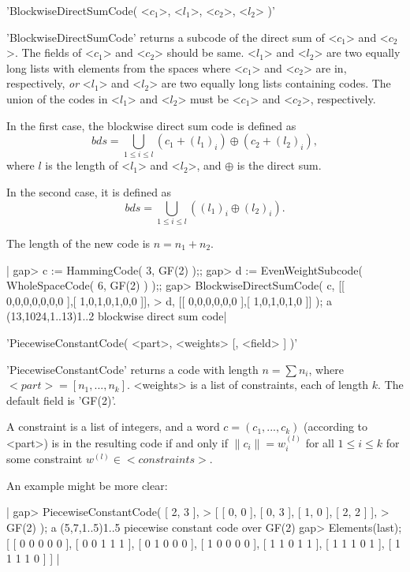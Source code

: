 'BlockwiseDirectSumCode( <$c_1$>, <$l_1$>, <$c_2$>, <$l_2$> )'

'BlockwiseDirectSumCode' returns a subcode of the direct sum of
<$c_1$> and <$c_2$>.
The fields of <$c_1$> and <$c_2$> should be same.
<$l_1$> and <$l_2$> are two equally long lists with elements from
the spaces where <$c_1$> and <$c_2$> are in, respectively,
{\em or} <$l_1$> and <$l_2$> are two equally long lists containing
codes. The union of the codes in <$l_1$> and <$l_2$> must be <$c_1$> and
<$c_2$>, respectively.

In the first case,
the blockwise direct sum code is defined as
$$ bds = \bigcup_{1 \leq i \leq l} 
	( c_1 + (l_1)_i ) \oplus ( c_2 + (l_2)_i ), $$
where $l$ is the length of <$l_1$> and <$l_2$>,
and $\oplus$ is the direct sum.

In the second case, it is defined as
$$ bds = \bigcup_{1 \leq i \leq l}
    ( (l_1)_i \oplus (l_2)_i ). $$

The length of the new code is
$ n = n_1 + n_2 $.

|    gap> c := HammingCode( 3, GF(2) );;
    gap> d := EvenWeightSubcode( WholeSpaceCode( 6, GF(2) ) );;
    gap> BlockwiseDirectSumCode( c, [[ 0,0,0,0,0,0,0 ],[ 1,0,1,0,1,0,0 ]],
    > d, [[ 0,0,0,0,0,0 ],[ 1,0,1,0,1,0 ]] );
    a (13,1024,1..13)1..2 blockwise direct sum code|




'PiecewiseConstantCode( <part>, <weights> [, <field> ] )'

'PiecewiseConstantCode' returns a code with length $n = \sum n_i$,
where $<part>=[ n_1, ..., n_k ]$.
<weights> is a list of constraints, each of length $k$.
The default field is 'GF(2)'.

A constraint is a list of integers, and
a word $c = ( c_1, ..., c_k )$ (according to <part>) 
is in the resulting code if and only if
$\|c_i\| = w_i^{(l)}$ for all $1 \leq i \leq k$
for some constraint $w^{(l)} \in <constraints>$.

An example might be more clear:

|    gap> PiecewiseConstantCode( [ 2, 3 ],
    > [ [ 0, 0 ], [ 0, 3 ], [ 1, 0 ], [ 2, 2 ] ],
    > GF(2) );
    a (5,7,1..5)1..5 piecewise constant code over GF(2)
    gap> Elements(last);
    [ [ 0 0 0 0 0 ], [ 0 0 1 1 1 ], [ 0 1 0 0 0 ], [ 1 0 0 0 0 ],
      [ 1 1 0 1 1 ], [ 1 1 1 0 1 ], [ 1 1 1 1 0 ] ] |

